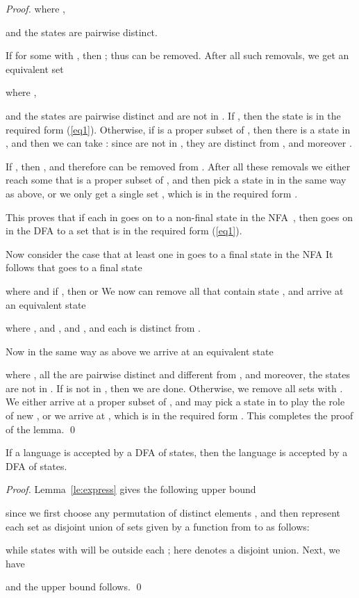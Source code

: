 \documentclass[runningheads]{llncs}
\begin{document}
\begin{proof}
 where ,
 
 and the states 
 are pairwise distinct.

 If  for some  with ,
 then ; thus  can be removed.
 After all such removals, we get an equivalent set
  
 where ,
 
 and the states 
 are pairwise distinct and  are not in .
 If , then the state   
 is in the required form (\ref{eq1}).
 Otherwise, if  is a proper subset of ,
 then there is a state  in ,
 and then we can take :
 since  are not in ,
 they are distinct from ,
 and moreover .

 If , then ,
 and therefore  can be removed from .
 After all these removals we
 either reach some  that is a proper subset of ,
 and then pick a state  in  in the same way as above,
 or we only get a single set ,
 which is in the required form .

 This proves that if  each  in  goes on 
 to a non-final state  in the NFA~,
 then  goes on  in the DFA  
 to a set that is in the required form (\ref{eq1}).

 \bigskip
 Now consider the case that 
 at least one   in 
 goes to a final state  in the NFA 
 It follows that 
  goes to a final state
 
 where  and if ,
 then  or 
 We now can remove all  that contain state ,
 and arrive at an equivalent state 
 
 where , and
 , and
 ,
 and each  is distinct from .

 Now in the same way as above we arrive at an equivalent state 
 
 where ,
 all the  are pairwise distinct and different from ,
 and moreover, the states  are not in .
 If  is not in , then we are done.
 Otherwise, we remove all sets with .
 We either arrive at a proper subset  of ,
 and may pick a state  in  to play the role of new ,
 or we arrive at ,
 which is in the required form .
 This completes the proof of the lemma.
\qed
\end{proof}

\begin{corollary}\label{-----co1}
 If a language  is accepted by a DFA of  states,
 then the language  is accepted by a DFA of  states.
\end{corollary}

\begin{proof}
 Lemma~\ref{le:express} gives the following upper bound
 
 since 
 we first choose any permutation of  distinct elements ,
 and then
 represent each set  as disjoint union of sets 
 given by a function  from  to 
 as follows:
 
 while states with  will be outside each ;
 here  denotes a disjoint union.
 Next, we  have
 
 and the upper bound follows.
\qed
\end{proof}
\end{document}
